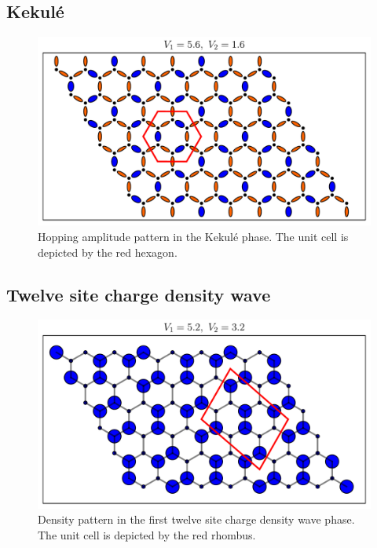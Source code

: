 \documentclass[aps,prx,10pt,twocolumn,floatfix,superscriptaddress,showpacs,numerical,footinbib]{revtex4-1}
\begin{document}
\subsection{Kekulé}
%
\begin{figure}
 \includegraphics[width=\columnwidth]{pdf/kekule.pdf}
 \caption{Hopping amplitude pattern in the Kekulé phase. The unit cell is depicted by the red hexagon.  \label{fig:kekule}}
\end{figure}

\subsection{Twelve site charge density wave}
%
\begin{figure}
 \includegraphics[width=\columnwidth]{pdf/cdw2.pdf}
 \caption{Density pattern in the first twelve site charge density wave phase. The unit cell is depicted by the red rhombus.  \label{fig:cdw2}}
\end{figure}
\end{document}
